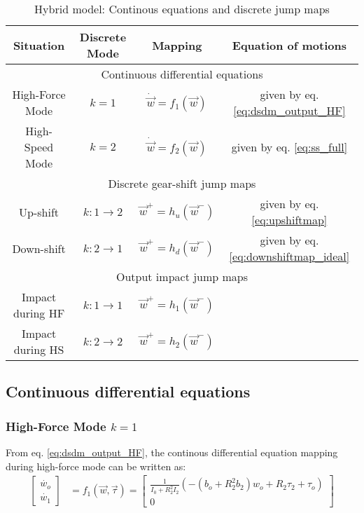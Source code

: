 \begin{table}[htbp]
	\centering
	\caption{Hybrid model: Continous equations and discrete jump maps}	%
		\begin{tabular}{ c c c c }
				\hline \hline
				Situation           & Discrete Mode     & Mapping   & Equation of motions \\
				\hline \hline
				\multicolumn{4}{c}{ Continuous differential equations }\\
        \hline
			   High-Force Mode    & $k=1$             & $\dot{\vec{w}} = f_1(\vec{w})$  & given by eq. \eqref{eq:dsdm_output_HF} \\
				 High-Speed Mode    & $k=2$             & $\dot{\vec{w}} = f_2(\vec{w})$  & given by eq. \eqref{eq:ss_full}             \\
				\hline
				\multicolumn{4}{c}{ Discrete gear-shift jump maps }\\
				\hline
				 Up-shift           & $k:1\rightarrow2$  & $\vec{w}^+= h_u(\vec{w}^-)$  &  given by eq. \eqref{eq:upshiftmap}\\
				 Down-shift         & $k:2\rightarrow1$  & $\vec{w}^+= h_d(\vec{w}^-)$  &  given by eq. \eqref{eq:downshiftmap_ideal}\\
				\hline
				\multicolumn{4}{c}{ Output impact jump maps }\\
				\hline
				 Impact during HF   & $k:1\rightarrow1$  & $\vec{w}^+= h_1(\vec{w}^-)$  &  \\
				 Impact during HS   & $k:2\rightarrow2$  & $\vec{w}^+= h_2(\vec{w}^-)$  &  \\
		    \hline \hline
        \end{tabular}		
	\label{tab:hybrid}
\end{table}



\subsection{Continuous differential equations}

\subsubsection{High-Force Mode $k=1$}

From eq. \eqref{eq:dsdm_output_HF}, the continous differential equation mapping during high-force mode can be written as:
%
\begin{align}
\left[
\begin{array}{c}
\dot{w_o}\\
\dot{w_1}
\end{array}
\right] &= f_1( \vec{w} , \vec{\tau} ) = 
\left[ \begin{array}{c}
\frac{1}{I_0 + R^2_2 I_2}\left( -(b_o + R_2^2 b_2) w_o + R_2 \tau_2 + \tau_o \right)\\
0
\end{array} \right]
\label{eq:f1}
\end{align}


